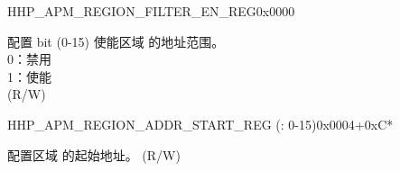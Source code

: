 \begin{register}{H}{HP\_APM\_REGION\_FILTER\_EN\_REG}{0x0000}\label{regdesc:HPAPMREGIONFILTERENREG}
%
%
\regnewline%
\begin{regdesc}\begin{reglist}
\label{fielddesc:HPAPMREGIONFILTEREN}\item [HP\_APM\_REGION\_FILTER\_EN] 配置 bit (0-15) 使能区域  的地址范围。\\
0：禁用 \\
1：使能  \\ (R/W)
\end{reglist}\end{regdesc}
\end{register}


\begin{register}{H}{HP\_APM\_REGION\_ADDR\_START\_REG (: 0-15)}{0x0004+0xC*}\label{regdesc:HPAPMREGION0ADDRSTARTREG}
%
\regnewline%
\begin{regdesc}\begin{reglist}
\label{fielddesc:HPAPMREGION0ADDRSTART}\item [HP\_APM\_REGION\regindex{n}\_ADDR\_START] 配置区域  的起始地址。 (R/W)
\end{reglist}\end{regdesc}
\end{register}

